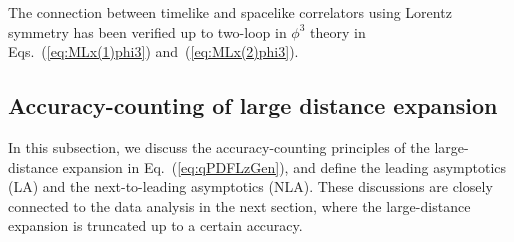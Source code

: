 \documentclass[a4paper,11pt]{article}
\begin{document}
The connection between timelike and spacelike correlators using Lorentz symmetry has been verified up to two-loop in $\phi^3$ theory in Eqs.~(\ref{eq:MLx(1)phi3}) and~(\ref{eq:MLx(2)phi3}). 

\subsection{Accuracy-counting of large distance expansion}\label{sec:AccuCount}
In this subsection, we discuss the accuracy-counting principles of the large-distance expansion in Eq.~(\ref{eq:qPDFLzGen}), and define the leading asymptotics (LA) and the next-to-leading asymptotics (NLA). These discussions are closely connected to the data analysis in the next section, where the large-distance expansion is truncated up to a certain accuracy. 
\end{document}
